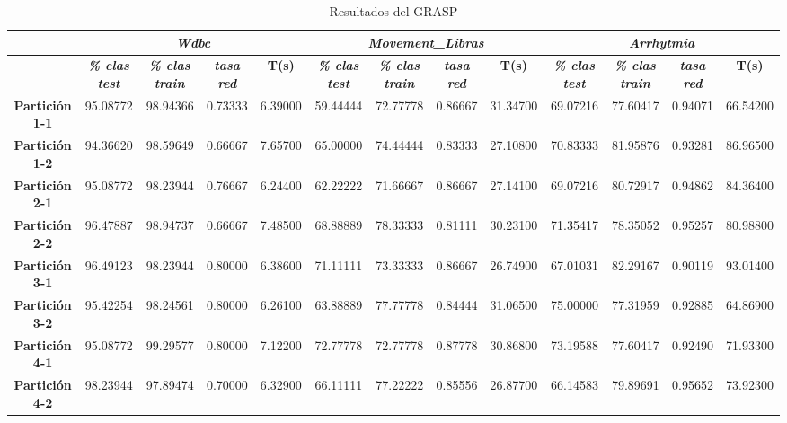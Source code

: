 \documentclass[a4paper,11pt]{article}
\begin{document}
  \begin{table}[H]
  \caption{Resultados del GRASP}
  \begin{adjustbox}{width=1.1\textwidth}
  \begin{tabular}{|c|r|r|r|r|r|r|r|r|r|r|r|r|}
  \hline
  \multicolumn{1}{|l|}{} & \multicolumn{ 4}{c|}{\textbf{\textit{Wdbc}}} & \multicolumn{ 4}{c|}{\textbf{\textit{Movement\_Libras}}} & \multicolumn{ 4}{c|}{\textbf{\textit{Arrhytmia}}} \\ \hline
  \multicolumn{1}{|l|}{} & \multicolumn{1}{c|}{\textbf{\textit{\% clas test}}} & \multicolumn{1}{c|}{\textbf{\textit{\% clas train}}} & \multicolumn{1}{c|}{\textbf{\textit{tasa red}}} & \multicolumn{1}{c|}{\textbf{T(s)}} & \multicolumn{1}{c|}{\textbf{\textit{\% clas test}}} & \multicolumn{1}{c|}{\textbf{\textit{\% clas train}}} & \multicolumn{1}{c|}{\textbf{\textit{tasa red}}} & \multicolumn{1}{c|}{\textbf{T(s)}} & \multicolumn{1}{c|}{\textbf{\textit{\% clas test}}} & \multicolumn{1}{c|}{\textbf{\textit{\% clas train}}} & \multicolumn{1}{c|}{\textbf{\textit{tasa red}}} & \multicolumn{1}{c|}{\textbf{T(s)}} \\ \hline
  \textbf{Partición 1-1} & 95.08772 & 98.94366 & 0.73333 & 6.39000 & 59.44444 & 72.77778 & 0.86667 & 31.34700 & 69.07216 & 77.60417 & 0.94071 & 66.54200 \\ \hline
  \textbf{Partición 1-2} & 94.36620 & 98.59649 & 0.66667 & 7.65700 & 65.00000 & 74.44444 & 0.83333 & 27.10800 & 70.83333 & 81.95876 & 0.93281 & 86.96500 \\ \hline
  \textbf{Partición 2-1} & 95.08772 & 98.23944 & 0.76667 & 6.24400 & 62.22222 & 71.66667 & 0.86667 & 27.14100 & 69.07216 & 80.72917 & 0.94862 & 84.36400 \\ \hline
  \textbf{Partición 2-2} & 96.47887 & 98.94737 & 0.66667 & 7.48500 & 68.88889 & 78.33333 & 0.81111 & 30.23100 & 71.35417 & 78.35052 & 0.95257 & 80.98800 \\ \hline
  \textbf{Partición 3-1} & 96.49123 & 98.23944 & 0.80000 & 6.38600 & 71.11111 & 73.33333 & 0.86667 & 26.74900 & 67.01031 & 82.29167 & 0.90119 & 93.01400 \\ \hline
  \textbf{Partición 3-2} & 95.42254 & 98.24561 & 0.80000 & 6.26100 & 63.88889 & 77.77778 & 0.84444 & 31.06500 & 75.00000 & 77.31959 & 0.92885 & 64.86900 \\ \hline
  \textbf{Partición 4-1} & 95.08772 & 99.29577 & 0.80000 & 7.12200 & 72.77778 & 72.77778 & 0.87778 & 30.86800 & 73.19588 & 77.60417 & 0.92490 & 71.93300 \\ \hline
  \textbf{Partición 4-2} & 98.23944 & 97.89474 & 0.70000 & 6.32900 & 66.11111 & 77.22222 & 0.85556 & 26.87700 & 66.14583 & 79.89691 & 0.95652 & 73.92300 \\ \hline

\end{tabular}
\end{adjustbox}
\end{table}
\end{document}
